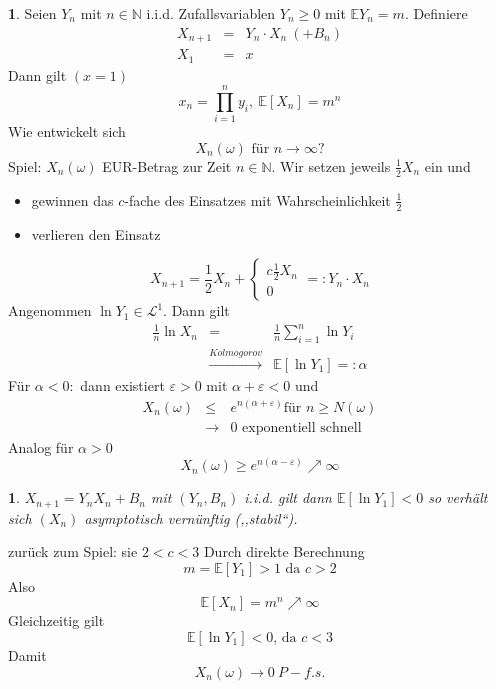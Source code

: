 \documentclass[10pt,a4paper]{report}
\numberwithin{equation}{section}
\numberwithin{figure}{section}
\theoremstyle{plain}
\theoremstyle{definition}
\newtheorem{example}[thm]{\protect\examplename}
\theoremstyle{remark}
\theoremstyle{plain}
\newtheorem*{fact*}{\protect\factname}
\providecommand{\examplename}{Beispiel}
\providecommand{\factname}{Fakt}
\newcommand{\1}{ \mathbb{1} } %
\begin{document}
\begin{example}

  {} Seien $Y_{n}$ mit $n\in\mathbb{N}$ i.i.d. Zufallsvariablen $Y_{n}\geq0$ mit
  $\mathbb{E}Y_{n}=m$. Definiere
  \begin{eqnarray*}
    X_{n+1} & = & Y_{n}\cdot X_{n}\ (+B_{n})\\
    X_{1} & = & x
  \end{eqnarray*}
  Dann gilt $\left(x=1\right)$
  \[
  x_{n}=\prod_{i=1}^{n}y_{i},\ \mathbb{E}\left[X_{n}\right]=m^{n}
  \]
  Wie entwickelt sich 
  \[
  X_{n}\left(\omega\right)\text{ für }n\to\infty?
  \]
  Spiel: $X_{n}\left(\omega\right)$ EUR-Betrag zur Zeit $n\in\mathbb{N}$.
  Wir setzen jeweils $\frac{1}{2}X_{n}$ ein und 
  \begin{itemize}
  \item gewinnen das $c$-fache des Einsatzes mit Wahrscheinlichkeit $\frac{1}{2}$
  \item verlieren den Einsatz
  \end{itemize}
  \[
  X_{n+1}=\frac{1}{2}X_{n}+\begin{cases}
    c\frac{1}{2}X_{n}\\
    0
  \end{cases}=:Y_{n}\cdot X_{n}
  \]
  Angenommen $\ln Y_{1}\in\mathcal{L}^{1}$. Dann gilt
  \begin{eqnarray*}
    \frac{1}{n}\ln X_{n} & = & \frac{1}{n}\sum_{i=1}^{n}\ln Y_{i}\\
    & \overset{Kolmogorov}{\longrightarrow} & \mathbb{E}\left[\ln Y_{1}\right]=:\alpha
  \end{eqnarray*}
  Für $\alpha<0:$ dann existiert $\varepsilon>0$ mit $\alpha+\varepsilon<0$
  und
  \begin{eqnarray*}
    X_{n}\left(\omega\right) & \leq & e^{n\left(\alpha+\varepsilon\right)}\text{für }n\geq N\left(\omega\right)\\
    & \to & 0\text{ exponentiell schnell}
  \end{eqnarray*}
  Analog für $\alpha>0$
  \[
  X_{n}\left(\omega\right)\geq e^{n\left(\alpha-\varepsilon\right)}\nearrow\infty
  \]
\end{example}
\begin{fact*}
  $X_{n+1}=Y_{n}X_{n}+B_{n}$ mit $\left(Y_{n},B_{n}\right)$ i.i.d.
  gilt dann $\mathbb{E}\left[\ln Y_{1}\right]<0$ so verhält sich $\left(X_{n}\right)$
  asymptotisch vernünftig (,,stabil``).
\end{fact*}
zurück zum Spiel: sie $2<c<3$ Durch direkte Berechnung
\[
m=\mathbb{E}\left[Y_{1}\right]>1\text{ da }c>2
\]
Also
\[
\mathbb{E}\left[X_{n}\right]=m^{n}\nearrow\infty
\]
Gleichzeitig gilt 
\[
\mathbb{E}\left[\ln Y_{1}\right]<0\text{, da }c<3
\]
Damit 
\[
X_{n}\left(\omega\right)\to0\ P-f.s.
\]
\end{document}
